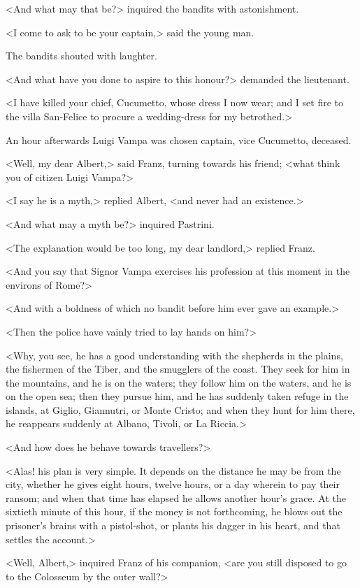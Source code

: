 {<And what may that be?> inquired the bandits with astonishment. 

<I come to ask to be your captain,> said the young man. 

The bandits shouted with laughter. 

<And what have you done to aspire to this honour?> demanded the lieutenant. 

<I have killed your chief, Cucumetto, whose dress I now wear; and I set fire to the villa San-Felice to procure a wedding-dress for my betrothed.> 

An hour afterwards Luigi Vampa was chosen captain, vice Cucumetto, deceased.}  <Well, my dear Albert,> said Franz, turning towards his friend; <what think you of citizen Luigi Vampa?> 

 <I say he is a myth,> replied Albert, <and never had an existence.> 

 <And what may a myth be?> inquired Pastrini. 

 <The explanation would be too long, my dear landlord,> replied Franz. 

 <And you say that Signor Vampa exercises his profession at this moment in the environs of Rome?> 

 <And with a boldness of which no bandit before him ever gave an example.> 

 <Then the police have vainly tried to lay hands on him?> 

 <Why, you see, he has a good understanding with the shepherds in the plains, the fishermen of the Tiber, and the smugglers of the coast. They seek for him in the mountains, and he is on the waters; they follow him on the waters, and he is on the open sea; then they pursue him, and he has suddenly taken refuge in the islands, at Giglio, Giannutri, or Monte Cristo; and when they hunt for him there, he reappears suddenly at Albano, Tivoli, or La Riccia.> 

 <And how does he behave towards travellers?> 

 <Alas! his plan is very simple. It depends on the distance he may be from the city, whether he gives eight hours, twelve hours, or a day wherein to pay their ransom; and when that time has elapsed he allows another hour's grace. At the sixtieth minute of this hour, if the money is not forthcoming, he blows out the prisoner's brains with a pistol-shot, or plants his dagger in his heart, and that settles the account.> 

 <Well, Albert,> inquired Franz of his companion, <are you still disposed to go to the Colosseum by the outer wall?> 

